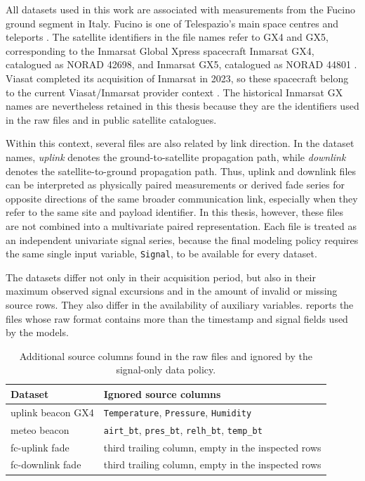 All datasets used in this work are associated with measurements from the
Fucino ground segment in Italy. Fucino is one of Telespazio's main space
centres and teleports \cite{telespazio_fucino}. The satellite identifiers in
the file names refer to GX4 and GX5, corresponding to the Inmarsat Global
Xpress spacecraft Inmarsat GX4, catalogued as NORAD 42698, and Inmarsat GX5,
catalogued as NORAD 44801 \cite{satbeams_gx4,satbeams_gx5}. Viasat completed
its acquisition of Inmarsat in 2023, so these spacecraft belong to the current
Viasat/Inmarsat provider context \cite{viasat_inmarsat_acquisition}. The
historical Inmarsat GX names are nevertheless retained in this thesis because
they are the identifiers used in the raw files and in public satellite
catalogues.

Within this context, several files are also related by link direction. In the
dataset names, \emph{uplink} denotes the ground-to-satellite propagation path,
while \emph{downlink} denotes the satellite-to-ground propagation path. Thus,
uplink and downlink files can be interpreted as physically paired measurements
or derived fade series for opposite directions of the same broader
communication link, especially when they refer to the same site and payload
identifier. In this thesis, however, these files are not combined into a
multivariate paired representation. Each file is treated as an independent
univariate signal series, because the final modeling policy requires the same
single input variable, \texttt{Signal}, to be available for every dataset.

The datasets differ not only in their acquisition period, but also in their
maximum observed signal excursions and in the amount of invalid or missing
source rows. They also differ in the availability of auxiliary variables.
 reports the files whose raw format contains
more than the timestamp and signal fields used by the models.

\begin{table}[htbp]
  \centering
  \caption{Additional source columns found in the raw files and ignored by the
  signal-only data policy.}
  \label{tab:ignored-source-columns}
  \begin{tabular}{lp{8.5cm}}
    \toprule
    Dataset & Ignored source columns \\
    \midrule
    uplink beacon GX4
      & \texttt{Temperature}, \texttt{Pressure}, \texttt{Humidity} \\
    meteo beacon
      & \texttt{airt\_bt}, \texttt{pres\_bt}, \texttt{relh\_bt}, \texttt{temp\_bt} \\
    fc-uplink fade
      & third trailing column, empty in the inspected rows \\
    fc-downlink fade
      & third trailing column, empty in the inspected rows \\
    \bottomrule
  \end{tabular}
\end{table}

